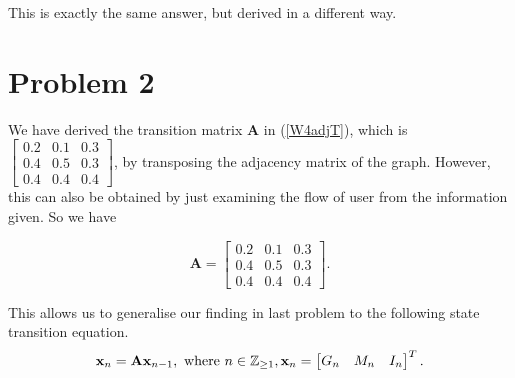 \documentclass[12pt,a4paper]{article}
\begin{document}
\begin{solution}
\begin{remark}
This is exactly the same answer, but derived in a different way.

\end{remark}

\end{solution}

\section*{Problem 2}
\begin{solution}
We have derived the transition matrix $\mathbf{A}$ in (\ref{W4adjT}), which is
$
\left[\begin{array}{lll}
0.2 & 0.1 & 0.3 \\
0.4 & 0.5 & 0.3 \\
0.4 & 0.4 & 0.4
\end{array}\right]
$,
by transposing the adjacency matrix of the graph. However, this can also be obtained by just examining the flow of user from the information given.
So we have 

$$\mathbf{A}=
\left[\begin{array}{lll}
0.2 & 0.1 & 0.3 \\
0.4 & 0.5 & 0.3 \\
0.4 & 0.4 & 0.4
\end{array}\right].$$


This allows us to generalise our finding in last problem to the following state transition equation.
\begin{equation}\label{W4state}
\mathbf{x}_n = \mathbf{A} \mathbf{x}_{n-1}, \text{ where } n\in \mathbb{Z}_{\geq 1}, 
\mathbf{x}_n =
\begin{bmatrix}
    G_n & M_n & I_n
\end{bmatrix}^T.
\end{equation}
\end{solution}
\end{document}
